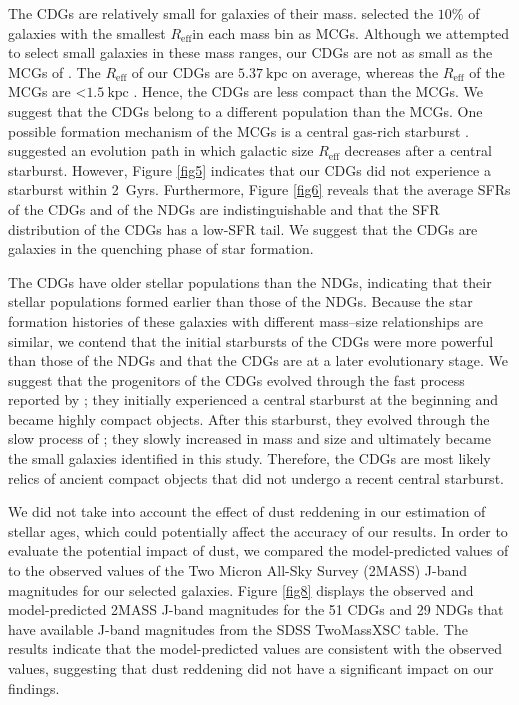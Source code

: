 \documentclass[fleqn,usenatbib]{mnras}
\begin{document}
The CDGs are relatively small for galaxies of their mass.
\citet{2021MNRAS.507..300S} selected the $10\%$ of galaxies with the smallest $R_\mathrm{eff}$in each mass bin as MCGs.
Although we attempted to select small galaxies in these mass ranges, our CDGs are not as small as the MCGs of \citet{2021MNRAS.507..300S}.
The $R_\mathrm{eff}$ of our CDGs are $5.37~\mathrm{kpc}$ on average, whereas the $R_\mathrm{eff}$ of the MCGs are <$1.5~\mathrm{kpc}$ \citep[e.g.,][]{2012MNRAS.423..632F,2015ApJ...813...23V,2021MNRAS.507..300S}.
Hence, the CDGs are less compact than the MCGs.
We suggest that the CDGs belong to a different population than the MCGs.
One possible formation mechanism of the MCGs is a central gas-rich starburst \citep[][]{2012MNRAS.423..632F,2021MNRAS.507..300S}.
\citet{2018ApJ...868...37W} suggested an evolution path in which galactic size $R_\mathrm{eff}$ decreases after a central starburst.
However, Figure \ref{fig5} indicates that our CDGs did not experience a starburst within 2~Gyrs.
Furthermore, Figure \ref{fig6} reveals that the average SFRs of the CDGs and of the NDGs are indistinguishable and that the SFR distribution of the CDGs has a low-SFR tail.
We suggest that the CDGs are galaxies in the quenching phase of star formation.

The CDGs have older stellar populations than the NDGs, indicating that their stellar populations formed earlier than those of the NDGs.
Because the star formation histories of these galaxies with different mass--size relationships are similar, we contend that the initial starbursts of the CDGs were more powerful than those of the NDGs and that the CDGs are at a later evolutionary stage. 
We suggest that the progenitors of the CDGs evolved through the fast process reported by \citet{2018ApJ...868...37W}; they initially experienced a central starburst at the beginning and became highly compact objects.
After this starburst, they evolved through the slow process of \citet{2018ApJ...868...37W}; they slowly increased in mass and size and ultimately became the small galaxies identified in this study.
Therefore, the CDGs are most likely relics of ancient compact objects that did not undergo a recent central starburst.

We did not take into account the effect of dust reddening in our estimation of stellar ages, which could potentially affect the accuracy of our results.
In order to evaluate the potential impact of dust, we compared the model-predicted values of \citet{2003MNRAS.344.1000B} to the observed values of the Two Micron All-Sky Survey (2MASS) J-band magnitudes for our selected galaxies.
Figure \ref{fig8} displays the observed and model-predicted 2MASS J-band magnitudes for the 51 CDGs and 29 NDGs that have available J-band magnitudes from the SDSS TwoMassXSC table.
The results indicate that the model-predicted values are consistent with the observed values, suggesting that dust reddening did not have a significant impact on our findings.
\end{document}
